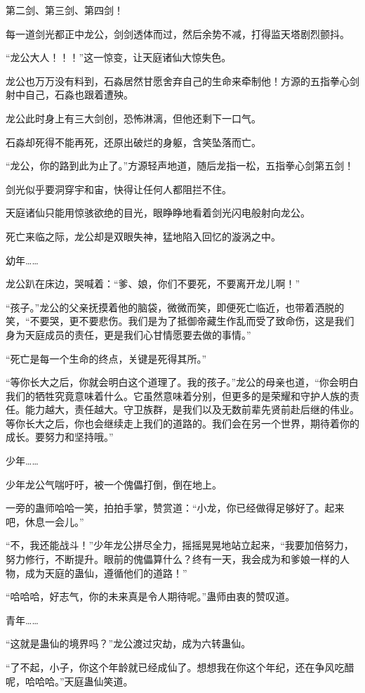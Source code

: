 \begin{this_body}
第二剑、第三剑、第四剑！

每一道剑光都正中龙公，剑剑透体而过，然后余势不减，打得监天塔剧烈颤抖。

“龙公大人！！！”这一惊变，让天庭诸仙大惊失色。

龙公也万万没有料到，石淼居然甘愿舍弃自己的生命来牵制他！方源的五指拳心剑射中自己，石淼也跟着遭殃。

龙公此时身上有三大剑创，恐怖淋漓，但他还剩下一口气。

石淼却死得不能再死，还原出破烂的身躯，含笑坠落而亡。

“龙公，你的路到此为止了。”方源轻声地道，随后龙指一松，五指拳心剑第五剑！

剑光似乎要洞穿宇和宙，快得让任何人都阻拦不住。

天庭诸仙只能用惊骇欲绝的目光，眼睁睁地看着剑光闪电般射向龙公。

死亡来临之际，龙公却是双眼失神，猛地陷入回忆的漩涡之中。

幼年……

龙公趴在床边，哭喊着：“爹、娘，你们不要死，不要离开龙儿啊！”

“孩子。”龙公的父亲抚摸着他的脑袋，微微而笑，即便死亡临近，也带着洒脱的笑，“不要哭，更不要悲伤。我们是为了抵御帝藏生作乱而受了致命伤，这是我们身为天庭成员的责任，更是我们心甘情愿要去做的事情。”

“死亡是每一个生命的终点，关键是死得其所。”

“等你长大之后，你就会明白这个道理了。我的孩子。”龙公的母亲也道，“你会明白我们的牺牲究竟意味着什么。它虽然意味着分别，但更多的是荣耀和守护人族的责任。能力越大，责任越大。守卫族群，是我们以及无数前辈先贤前赴后继的伟业。等你长大之后，你也会继续走上我们的道路的。我们会在另一个世界，期待着你的成长。要努力和坚持哦。”

少年……

少年龙公气喘吁吁，被一个傀儡打倒，倒在地上。

一旁的蛊师哈哈一笑，拍拍手掌，赞赏道：“小龙，你已经做得足够好了。起来吧，休息一会儿。”

“不，我还能战斗！”少年龙公拼尽全力，摇摇晃晃地站立起来，“我要加倍努力，努力修行，不断提升。眼前的傀儡算什么？终有一天，我会成为和爹娘一样的人物，成为天庭的蛊仙，遵循他们的道路！”

“哈哈哈，好志气，你的未来真是令人期待呢。”蛊师由衷的赞叹道。

青年……

“这就是蛊仙的境界吗？”龙公渡过灾劫，成为六转蛊仙。

“了不起，小子，你这个年龄就已经成仙了。想想我在你这个年纪，还在争风吃醋呢，哈哈哈。”天庭蛊仙笑道。


\end{this_body}
